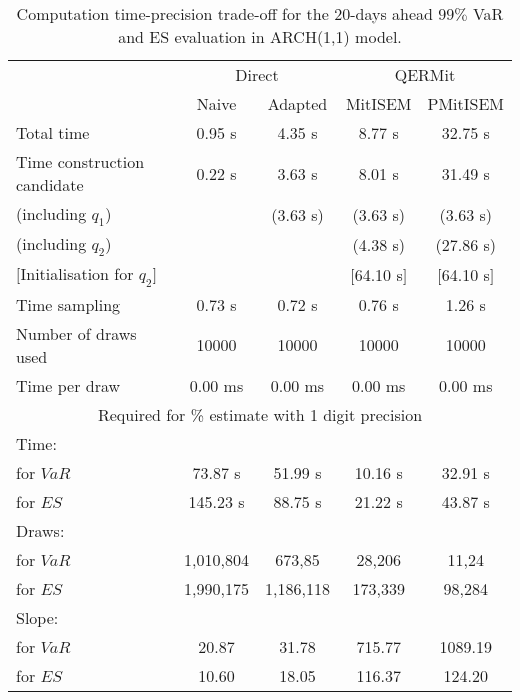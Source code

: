 { \renewcommand{\arraystretch}{1.3} 
\begin{table}[h] 
\centering 
\caption{Computation time-precision trade-off for the 20-days ahead  $99\%$ VaR and ES evaluation in ARCH(1,1) model.} 
\label{tab:time_precision_arch} 
\begin{tabular}{lcccc}  
  & \multicolumn{2}{c}{Direct} & \multicolumn{2}{c}{QERMit}  \\ \cline{2-5} 
  & Naive & Adapted & MitISEM & PMitISEM  \\ \hline 
Total time & 0.95 s & 4.35 s & 8.77 s & 32.75 s \\ 
Time construction candidate & 0.22 s & 3.63 s & 8.01 s & 31.49 s \\ 
 (including $q_{1}$) &   &  (3.63 s) & (3.63 s) & (3.63 s) \\ 
 (including $q_{2}$) &   &  & (4.38 s) & (27.86 s) \\ 
$[$Initialisation for $q_{2}$$]$&   &   & $[$64.10 s$]$ & $[$64.10 s$]$ \\ 
Time sampling & 0.73 s & 0.72 s & 0.76 s & 1.26 s  \\  
Number of draws used & 10000 & 10000 & 10000 & 10000 \\ 
Time per draw & 0.00 ms & 0.00 ms & 0.00 ms & 0.00 ms \\ \hline 
\multicolumn{5}{c}{Required for \% estimate with 1 digit precision} \\ \hline 
Time: &  &  &   &  \\ 
\hspace{1cm} for $VaR$ & 73.87 s & 51.99 s & 10.16 s & 32.91 s \\ 
\hspace{1cm} for $ES$ & 145.23 s & 88.75 s & 21.22 s & 43.87 s \\ 
Draws: &  &  &   &  \\ 
\hspace{1cm} for $VaR$ & 1,010,804 & 673,85  & 28,206  & 11,24  \\ 
\hspace{1cm} for $ES$ & 1,990,175 & 1,186,118  & 173,339   & 98,284  \\ 
\hline 
Slope: &  &  &   &  \\ 
\hspace{1cm} for $VaR$ & 20.87 & 31.78  & 715.77  & 1089.19  \\ 
\hspace{1cm} for $ES$ & 10.60 & 18.05  & 116.37   & 124.20  \\  \hline 
\end{tabular} 
\end{table} 
} 
